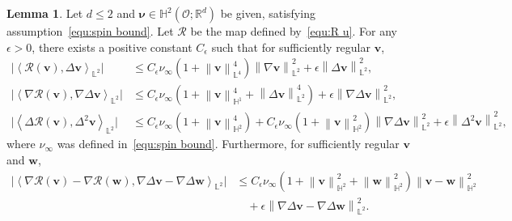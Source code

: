 \documentclass[11pt, reqno]{amsart}
\theoremstyle{definition}
\newtheorem{lemma}[theorem]{Lemma}
\numberwithin{equation}{section}
\newcommand{\bff}{\boldsymbol}
\newcommand{\bb}{\mathbb}
\newcommand{\norm}[2]{\left\|{#1}\right\|_{#2}}
\newcommand{\inpro}[2]{\left\langle#1,#2\right\rangle}
\begin{document}
\begin{lemma}
Let $d\leq 2$ and $\bff{\nu}\in \bb{H}^2(\mathscr{O};\bb{R}^d)$ be given, satisfying assumption~\eqref{equ:spin bound}. Let $\mathcal{R}$ be the map defined by~\eqref{equ:R u}.
For any $\epsilon>0$, there exists a positive constant $C_\epsilon$ such that for sufficiently regular $\bff{v}$,
\begin{align}
	\label{equ:2d Rv Delta v}
	\big| \inpro{\mathcal{R}(\bff{v})}{\Delta \bff{v}}_{\bb{L}^2} \big|
	&\leq
	C_\epsilon \nu_\infty
	\left(1+\norm{\bff{v}}{\bb{L}^4}^4 \right) \norm{\nabla \bff{v}}{\bb{L}^2}^2
	+
	\epsilon \norm{\Delta \bff{v}}{\bb{L}^2}^2,
	\\
	\label{equ:2d Rv Delta2 v}
	\big| \inpro{\nabla \mathcal{R}(\bff{v})}{\nabla \Delta \bff{v}}_{\bb{L}^2} \big|
	&\leq
	C_\epsilon \nu_\infty \left(1+ \norm{\bff{v}}{\bb{H}^1}^4 + \norm{\Delta \bff{v}}{\bb{L}^2}^4 \right) 
	+
	\epsilon \norm{\nabla \Delta \bff{v}}{\bb{L}^2}^2,
	\\
	\label{equ:2d Delta Rv Delta2 v}
	\big| \inpro{\Delta \mathcal{R}(\bff{v})}{\Delta^2 \bff{v}}_{\bb{L}^2} \big|
	&\leq
	C_\epsilon \nu_\infty \left(1+ \norm{\bff{v}}{\bb{H}^2}^4 \right)
	+
	C_\epsilon \nu_\infty \left(1+ \norm{\bff{v}}{\bb{H}^2}^2 \right) \norm{\nabla\Delta \bff{v}}{\bb{L}^2}^2
	+ 
	\epsilon \norm{\Delta^2 \bff{v}}{\bb{L}^2}^2,
\end{align}
where $\nu_\infty$ was defined in~\eqref{equ:spin bound}. Furthermore, for sufficiently regular $\bff{v}$ and $\bff{w}$,
\begin{align}
	\label{equ:2d nab RvRw}
	\big| \inpro{\nabla \mathcal{R}(\bff{v})- \nabla\mathcal{R}(\bff{w})}{\nabla \Delta \bff{v}-\nabla \Delta\bff{w}}_{\bb{L}^2} \big|
	&\leq
	C_\epsilon \nu_\infty \left(1+ \norm{\bff{v}}{\bb{H}^2}^2 + \norm{\bff{w}}{\bb{H}^2}^2 \right) \norm{\bff{v}-\bff{w}}{\bb{H}^2}^2
	\nonumber \\
	&\quad
	+
	\epsilon \norm{\nabla \Delta \bff{v}-\nabla \Delta\bff{w}}{\bb{L}^2}^2.
\end{align}
\end{lemma}
\end{document}
